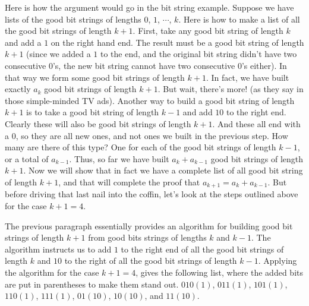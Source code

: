 Here is how the argument would go in the bit string example. Suppose we have
lists of the good bit strings of lengths $0$, $1$, $\cdots$, $k$. Here is how to
make a list of all the good bit strings of length $k+1$. First, take any good bit
string of length $k$ and add a $1$ on the right hand end. The result must be a
good bit string of length $k+1$ (since we added a $1$ to the end, and the original
bit string didn't have two consecutive $0$'s, the new bit string cannot have two
consecutive $0$'s either). In that way we form some good bit strings of length
$k+1$. In fact, we have built exactly $a_k$ good bit strings of length $k+1$. But
wait, there's more! (as they say in those simple-minded TV ads). Another way to
build a good bit string of length $k+1$ is to take a good bit
string of length $k-1$ and add $10$ to the right end. Clearly these will also be
good bit strings of length $k+1$. And these all end with a $0$, so they are all
new ones, and not ones we built in the previous step. How many are there of this
type? One for each of the good bit strings of length $k-1$, or a total of
$a_{k-1}$. Thus, so far we have built $a_k+a_{k-1}$ good bit strings of length
$k+1$. Now we will show that in fact we have a complete list of all good bit
string of length $k+1$, and that will complete the proof that $a_{k+1} = a_k +
a_{k-1}$. But before driving that last nail into the coffin, let's look at the
steps outlined above for the case $k+1=4$.



The previous paragraph essentially provides an algorithm for building good
bit strings of length $k+1$ from good bits strings of lengths $k$ and $k-1$. The
algorithm instructs us to add $1$ to the right end of all the good bit strings of
length $k$ and $10$ to the right of all the good bit strings of length
$k-1$. Applying the algorithm for the case $k+1=4$, gives the following list,
where the added bits are put in parentheses to make them stand out.
$010(1)$,
$011(1)$, $101(1)$, $110(1)$, $111(1)$, $01(10)$, $10(10)$, and $11(10)$.


